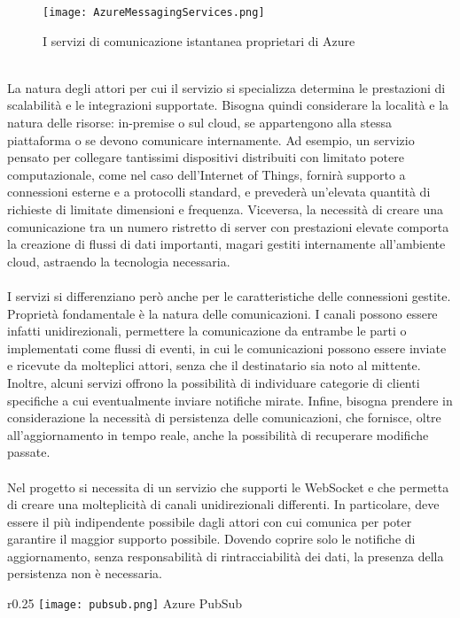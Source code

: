 \begin{figure}[h!]
    \centering
    \texttt{[image: AzureMessagingServices.png]}
    \caption{I servizi di comunicazione istantanea proprietari di Azure}
\end{figure}	\\
La natura degli attori per cui il servizio si specializza 
determina le prestazioni di scalabilità e le integrazioni supportate. 
Bisogna quindi considerare la località e la natura delle risorse: in-premise o sul cloud, 
se appartengono alla stessa piattaforma o se devono comunicare internamente.
Ad esempio, un servizio pensato per collegare tantissimi dispositivi distribuiti con limitato potere computazionale, 
come nel caso dell’Internet of Things, fornirà  supporto a connessioni esterne e a protocolli standard, 
e prevederà un’elevata quantità di richieste di limitate dimensioni e frequenza. 
Viceversa, la necessità di creare una comunicazione tra un numero ristretto di server con prestazioni elevate 
comporta la creazione di flussi di dati importanti, 
magari gestiti internamente all’ambiente cloud, astraendo la tecnologia necessaria.\\
\\
I servizi si differenziano però anche per le caratteristiche delle connessioni gestite.
Proprietà fondamentale è la natura delle comunicazioni. 
I canali possono essere infatti unidirezionali, 
permettere la comunicazione da entrambe le parti o implementati come flussi di eventi, 
in cui le comunicazioni possono essere inviate e ricevute da molteplici attori, 
senza che il destinatario sia noto al mittente. 
Inoltre, alcuni servizi offrono la possibilità di individuare categorie di clienti specifiche 
a cui eventualmente inviare notifiche mirate. 
Infine, bisogna prendere in considerazione la necessità di persistenza delle comunicazioni, 
che fornisce, oltre all’aggiornamento in tempo reale, 
anche la possibilità di recuperare modifiche passate.\\
\\
Nel progetto si necessita di un servizio che supporti le WebSocket 
e che permetta di creare una molteplicità di canali unidirezionali differenti. 
In particolare, deve essere il più indipendente possibile dagli attori 
con cui comunica per poter garantire il maggior supporto possibile. 
Dovendo coprire solo le notifiche di aggiornamento, 
senza responsabilità di rintracciabilità dei dati, 
la presenza della persistenza non è necessaria.\\
\begin{wrapfigure}{r}{0.25\textwidth}
    \centering
    \texttt{[image: pubsub.png]}
    Azure PubSub
\end{wrapfigure}
